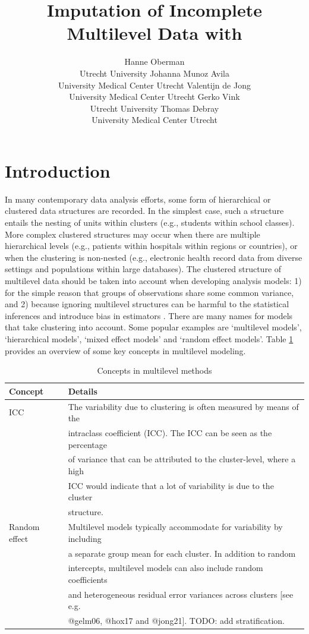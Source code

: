 \documentclass[
]{jss}
\author{
Hanne Oberman\\Utrecht University \And Johanna Munoz Avila\\University
Medical Center Utrecht \AND Valentijn de Jong\\University Medical
Center Utrecht \And Gerko Vink\\Utrecht University \AND Thomas
Debray\\University Medical Center Utrecht
}
\title{Imputation of Incomplete Multilevel Data with \pkg{mice}}
\begin{document}
\hypertarget{introduction}{%
\section{Introduction}\label{introduction}}

In many contemporary data analysis efforts, some form of hierarchical or
clustered data structures are recorded. In the simplest case, such a
structure entails the nesting of units within clusters (e.g., students
within school classes). More complex clustered structures may occur when
there are multiple hierarchical levels (e.g., patients within hospitals
within regions or countries), or when the clustering is non-nested
(e.g., electronic health record data from diverse settings and
populations within large databases). The clustered structure of
multilevel data should be taken into account when developing analysis
models: 1) for the simple reason that groups of observations share some
common variance, and 2) because ignoring multilevel structures can be
harmful to the statistical inferences and introduce bias in estimators
\citep{hox17}. There are many names for models that take clustering into
account. Some popular examples are `multilevel models', `hierarchical
models', `mixed effect models' and `random effect models'. Table
\ref{tab:clus} provides an overview of some key concepts in multilevel
modeling.

\begin{table}[tb]
\caption{Concepts in multilevel methods}
\label{tab:clus}
\centering
\begin{tabular}{ll}
\hline
\textbf{Concept} & \textbf{Details}   \\
\hline
ICC                 & The variability due to clustering is often measured by means of the \\
                    & intraclass coefficient (ICC). The ICC can be seen as the percentage \\
                    & of variance that can be attributed to the cluster-level, where a high \\
                    & ICC would indicate that a lot of variability is due to the cluster \\
                    & structure. \\
Random effect       & Multilevel models typically accommodate for variability by including \\
                    & a separate group mean for each cluster. In addition to random \\
                    & intercepts, multilevel models can also include random coefficients \\
                    & and heterogeneous residual error variances across clusters [see e.g. \\
                    & @gelm06, @hox17 and @jong21]. TODO: add stratification. \\
\hline
\end{tabular}
\end{table}
\end{document}
